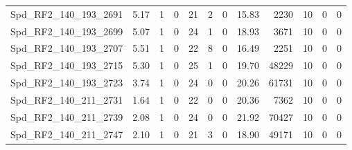 \begin{longtable}[c]{@{}lrrrrrrrrrrr@{}}
Spd\_RF2\_140\_193\_2691     & 5.17                   & 1                       & 0                       & 21                     & 2                       & 0                       & 15.83                   & 2230                     & 10                       & 0                        & 0                        \\
Spd\_RF2\_140\_193\_2699     & 5.07                   & 1                       & 0                       & 24                     & 1                       & 0                       & 18.93                   & 3671                     & 10                       & 0                        & 0                        \\
Spd\_RF2\_140\_193\_2707     & 5.51                   & 1                       & 0                       & 22                     & 8                       & 0                       & 16.49                   & 2251                     & 10                       & 0                        & 0                        \\
Spd\_RF2\_140\_193\_2715     & 5.30                   & 1                       & 0                       & 25                     & 1                       & 0                       & 19.70                   & 48229                    & 10                       & 0                        & 0                        \\
Spd\_RF2\_140\_193\_2723     & 3.74                   & 1                       & 0                       & 24                     & 0                       & 0                       & 20.26                   & 61731                    & 10                       & 0                        & 0                        \\
Spd\_RF2\_140\_211\_2731     & 1.64                   & 1                       & 0                       & 22                     & 0                       & 0                       & 20.36                   & 7362                     & 10                       & 0                        & 0                        \\
Spd\_RF2\_140\_211\_2739     & 2.08                   & 1                       & 0                       & 24                     & 0                       & 0                       & 21.92                   & 70427                    & 10                       & 0                        & 0                        \\
Spd\_RF2\_140\_211\_2747     & 2.10                   & 1                       & 0                       & 21                     & 3                       & 0                       & 18.90                   & 49171                    & 10                       & 0                        & 0                        \\

\end{longtable}
